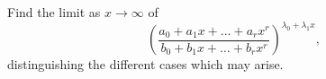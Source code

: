 Find the limit as $x \to \infty$ of
\[
\left(\frac{a_{0} + a_{1} x + \dots + a_{r} x^{r}}
           {b_{0} + b_{1} x + \dots + b_{r} x^{r}}\right)^{\lambda_{0}+\lambda_{1}x},
\]
distinguishing the different cases which may arise. 

